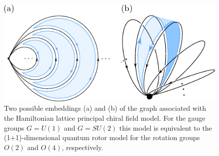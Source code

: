 \documentclass[twocolumn,lengthcheck,superscriptaddress]{revtex4-1}
\theoremstyle{definition}
\theoremstyle{remark}
\begin{document}
\begin{figure}[b]
  \includegraphics{petal_earring_text.pdf}
  \caption{\label{fig:earring} Two possible embeddings (a) and (b) of the graph associated with the
           Hamiltonian lattice principal chiral field model.
           For the gauge groups $G=U(1)$ and $G=SU(2)$ this model is equivalent to the
           (1+1)-dimensional quantum rotor model
           for the rotation groups $O(2)$ and $O(4)$, respectively.
           }
\end{figure}
\end{document}
